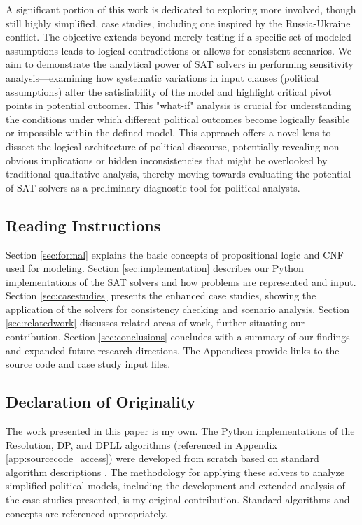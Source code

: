 \documentclass[11pt, a4paper]{article}
\begin{document}
A significant portion of this work is dedicated to exploring more involved, though still highly simplified, case studies, including one inspired by the Russia-Ukraine conflict. The objective extends beyond merely testing if a specific set of modeled assumptions leads to logical contradictions or allows for consistent scenarios. We aim to demonstrate the analytical power of SAT solvers in performing sensitivity analysis—examining how systematic variations in input clauses (political assumptions) alter the satisfiability of the model and highlight critical pivot points in potential outcomes. This "what-if" analysis is crucial for understanding the conditions under which different political outcomes become logically feasible or impossible within the defined model. This approach offers a novel lens to dissect the logical architecture of political discourse, potentially revealing non-obvious implications or hidden inconsistencies that might be overlooked by traditional qualitative analysis, thereby moving towards evaluating the potential of SAT solvers as a preliminary diagnostic tool for political analysts.

\subsection*{Reading Instructions}
Section \ref{sec:formal} explains the basic concepts of propositional logic and CNF used for modeling. Section \ref{sec:implementation} describes our Python implementations of the SAT solvers and how problems are represented and input. Section \ref{sec:casestudies} presents the enhanced case studies, showing the application of the solvers for consistency checking and scenario analysis. Section \ref{sec:relatedwork} discusses related areas of work, further situating our contribution. Section \ref{sec:conclusions} concludes with a summary of our findings and expanded future research directions. The Appendices provide links to the source code and case study input files.

\subsection*{Declaration of Originality}
The work presented in this paper is my own. The Python implementations of the Resolution, DP, and DPLL algorithms (referenced in Appendix \ref{app:sourcecode_access}) were developed from scratch based on standard algorithm descriptions \cite{Robinson1965, DavisPutnam1960, DPLL1962}. The methodology for applying these solvers to analyze simplified political models, including the development and extended analysis of the case studies presented, is my original contribution. Standard algorithms and concepts are referenced appropriately.
\end{document}
